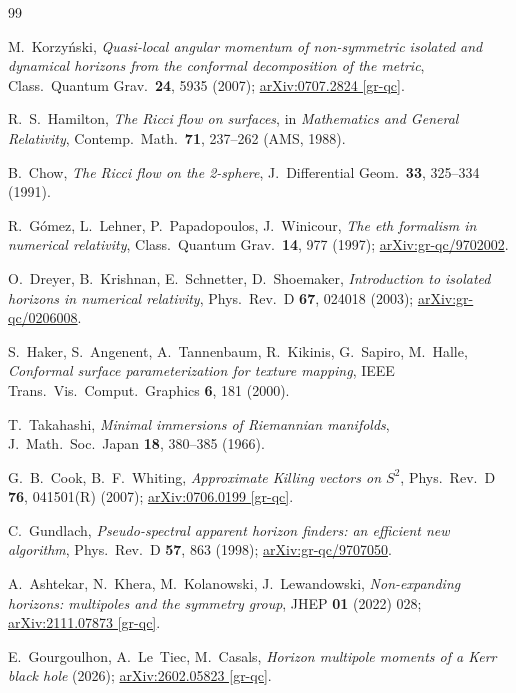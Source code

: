 \documentclass[11pt]{article}
\begin{document}
\begin{thebibliography}{99}

M.~Korzy\'nski,
\emph{Quasi-local angular momentum of non-symmetric isolated and dynamical
horizons from the conformal decomposition of the metric},
Class.\ Quantum Grav.\ \textbf{24}, 5935 (2007);
\href{https://arxiv.org/abs/0707.2824}{arXiv:0707.2824 [gr-qc]}.

R.~S.~Hamilton,
\emph{The Ricci flow on surfaces},
in \emph{Mathematics and General Relativity}, Contemp.\ Math.\ \textbf{71},
237--262 (AMS, 1988).

B.~Chow,
\emph{The Ricci flow on the 2-sphere},
J.\ Differential Geom.\ \textbf{33}, 325--334 (1991).

R.~G\'omez, L.~Lehner, P.~Papadopoulos, J.~Winicour,
\emph{The eth formalism in numerical relativity},
Class.\ Quantum Grav.\ \textbf{14}, 977 (1997);
\href{https://arxiv.org/abs/gr-qc/9702002}{arXiv:gr-qc/9702002}.

O.~Dreyer, B.~Krishnan, E.~Schnetter, D.~Shoemaker,
\emph{Introduction to isolated horizons in numerical relativity},
Phys.\ Rev.\ D \textbf{67}, 024018 (2003);
\href{https://arxiv.org/abs/gr-qc/0206008}{arXiv:gr-qc/0206008}.

S.~Haker, S.~Angenent, A.~Tannenbaum, R.~Kikinis, G.~Sapiro, M.~Halle,
\emph{Conformal surface parameterization for texture mapping},
IEEE Trans.\ Vis.\ Comput.\ Graphics \textbf{6}, 181 (2000).

T.~Takahashi,
\emph{Minimal immersions of Riemannian manifolds},
J.\ Math.\ Soc.\ Japan \textbf{18}, 380--385 (1966).

G.~B.~Cook, B.~F.~Whiting,
\emph{Approximate Killing vectors on $S^2$},
Phys.\ Rev.\ D \textbf{76}, 041501(R) (2007);
\href{https://arxiv.org/abs/0706.0199}{arXiv:0706.0199 [gr-qc]}.

C.~Gundlach,
\emph{Pseudo-spectral apparent horizon finders: an efficient new algorithm},
Phys.\ Rev.\ D \textbf{57}, 863 (1998);
\href{https://arxiv.org/abs/gr-qc/9707050}{arXiv:gr-qc/9707050}.

A.~Ashtekar, N.~Khera, M.~Kolanowski, J.~Lewandowski,
\emph{Non-expanding horizons: multipoles and the symmetry group},
JHEP \textbf{01} (2022) 028;
\href{https://arxiv.org/abs/2111.07873}{arXiv:2111.07873 [gr-qc]}.

E.~Gourgoulhon, A.~Le~Tiec, M.~Casals,
\emph{Horizon multipole moments of a Kerr black hole} (2026);
\href{https://arxiv.org/abs/2602.05823}{arXiv:2602.05823 [gr-qc]}.

\end{thebibliography}
\end{document}
